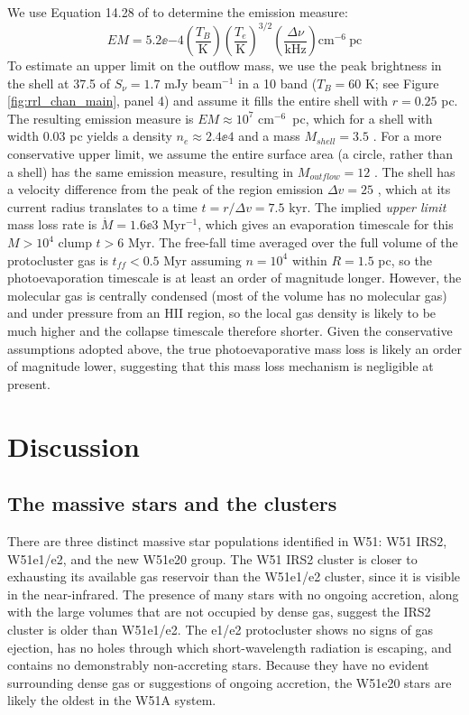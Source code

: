 We use Equation 14.28 of \citet{Wilson2009a} to determine the emission measure:
\begin{equation}
    EM = 5.2\ee{-4} 
    \left(\frac{T_B}{\mathrm{K}}\right)
    \left(\frac{T_e}{\mathrm{K}}\right)^{3/2} \left(\frac{\Delta
    \nu}{\mathrm{kHz}}\right) \mathrm{cm}^{-6}\mathrm{~pc}
\end{equation}
To estimate an upper limit on the outflow mass, we use the peak brightness in the shell at 37.5
\kms of $S_\nu=1.7$ mJy beam$^{-1}$ in a 10 \kms band ($T_B=60$ K;
 see Figure
\ref{fig:rrl_chan_main}, panel 4) and assume it fills the entire shell with
$r=0.25$ pc.  The resulting emission measure is $EM\approx10^7$ cm$^{-6}$~pc,
which for a shell with width 0.03 pc yields a density $n_e\approx2.4\ee{4}$
\percc and a mass $M_{shell}=3.5$ \msun.  For a more conservative upper limit,
we assume the entire surface area (a circle, rather than a shell) has the same
emission measure, resulting in $M_{outflow}=12$ \msun.  The shell has a velocity
difference from the peak of the \hii region emission $\Delta v=25$ \kms, which
at its current radius translates to a time $t = r / \Delta v = 7.5$ kyr.
The implied \emph{upper limit} mass loss rate is $\dot{M} = 1.6\ee{3}$ \msun
Myr$^{-1}$, which gives an evaporation timescale for this $M>10^4$ \msun
clump $t>6$ Myr.  The free-fall time averaged over the full volume of the protocluster gas is $t_{ff} < 0.5$ Myr
assuming $n=10^4$ \percc within $R=1.5$ pc, so the photoevaporation timescale is
at least an order of magnitude longer.  However, the molecular gas is centrally
condensed (most of the volume has no molecular gas) and under pressure from an
HII region, so the local gas density is likely to be much higher and the
collapse timescale therefore shorter.
Given the conservative assumptions adopted above, the true photoevaporative
mass loss is likely an order of magnitude lower, suggesting that this mass loss
mechanism is negligible at present.


\section{Discussion}
\label{sec:discussion}

\subsection{The massive stars and the clusters}
\label{sec:mstarscluster}
There are three distinct massive star populations identified in W51: W51 IRS2,
W51e1/e2, and the new W51e20 group.  The W51 IRS2 cluster is closer to
exhausting its available gas reservoir than the W51e1/e2 cluster, since it is
visible in the near-infrared.  The presence of many stars with no ongoing
accretion, along with the large volumes that are not occupied by dense gas,
suggest the IRS2 cluster is older than W51e1/e2. The e1/e2 protocluster shows
no signs of gas ejection, has no holes through which short-wavelength radiation
is escaping, and contains no demonstrably non-accreting stars.  
Because they have no evident surrounding dense gas or suggestions of ongoing
accretion, the W51e20 stars are likely the oldest in the W51A system.

